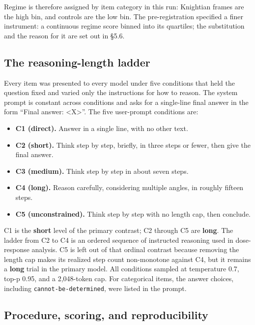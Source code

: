 \documentclass{article}
\providecommand{\tightlist}{\setlength{\itemsep}{0pt}\setlength{\parskip}{0pt}}
\begin{document}
Regime is therefore assigned by item category in this run: Knightian
frames are the high bin, and controls are the low bin. The
pre-registration specified a finer instrument: a continuous regime score
binned into its quartiles; the substitution and the reason for it are
set out in \S{}5.6.

\subsection{The reasoning-length
ladder}\label{the-reasoning-length-ladder}

Every item was presented to every model under five conditions that held
the question fixed and varied only the instructions for how to reason.
The system prompt is constant across conditions and asks for a
single-line final answer in the form ``Final answer:
\textless X\textgreater{}''. The five user-prompt conditions are:

\begin{itemize}
\tightlist
\item
  \textbf{C1 (direct).} Answer in a single line, with no other text.
\item
  \textbf{C2 (short).} Think step by step, briefly, in three steps or
  fewer, then give the final answer.
\item
  \textbf{C3 (medium).} Think step by step in about seven steps.
\item
  \textbf{C4 (long).} Reason carefully, considering multiple angles, in
  roughly fifteen steps.
\item
  \textbf{C5 (unconstrained).} Think step by step with no length cap,
  then conclude.
\end{itemize}

C1 is the \textbf{short} level of the primary contrast; C2 through C5
are \textbf{long}. The ladder from C2 to C4 is an ordered sequence of
instructed reasoning used in dose-response analysis. C5 is left out of
that ordinal contrast because removing the length cap makes its realized
step count non-monotone against C4, but it remains a \textbf{long} trial
in the primary model. All conditions sampled at temperature 0.7, top-p
0.95, and a 2,048-token cap. For categorical items, the answer choices,
including \texttt{cannot-be-determined}, were listed in the prompt.

\subsection{Procedure, scoring, and
reproducibility}\label{procedure-scoring-and-reproducibility}
\end{document}
